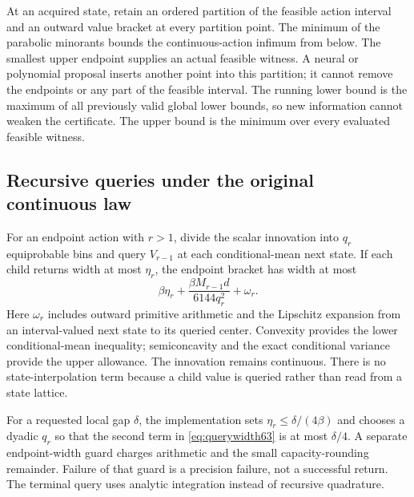 At an acquired state, retain an ordered partition of the feasible action interval and an outward value bracket at every partition point. The minimum of the parabolic minorants bounds the continuous-action infimum from below. The smallest upper endpoint supplies an actual feasible witness. A neural or polynomial proposal inserts another point into this partition; it cannot remove the endpoints or any part of the feasible interval. The running lower bound is the maximum of all previously valid global lower bounds, so new information cannot weaken the certificate. The upper bound is the minimum over every evaluated feasible witness.

\subsection{Recursive queries under the original continuous law}
For an endpoint action with $r>1$, divide the scalar innovation into $q_r$ equiprobable bins and query $V_{r-1}$ at each conditional-mean next state. If each child returns width at most $\eta_r$, the endpoint bracket has width at most
\begin{equation}\label{eq:querywidth63}
 \beta\eta_r+\frac{\beta M_{r-1}d}{6144q_r^2}+\omega_r.
\end{equation}
Here $\omega_r$ includes outward primitive arithmetic and the Lipschitz expansion from an interval-valued next state to its queried center. Convexity provides the lower conditional-mean inequality; semiconcavity and the exact conditional variance provide the upper allowance. The innovation remains continuous. There is no state-interpolation term because a child value is queried rather than read from a state lattice.

For a requested local gap $\delta$, the implementation sets $\eta_r\le\delta/(4\beta)$ and chooses a dyadic $q_r$ so that the second term in \eqref{eq:querywidth63} is at most $\delta/4$. A separate endpoint-width guard charges arithmetic and the small capacity-rounding remainder. Failure of that guard is a precision failure, not a successful return. The terminal query uses analytic integration instead of recursive quadrature.

